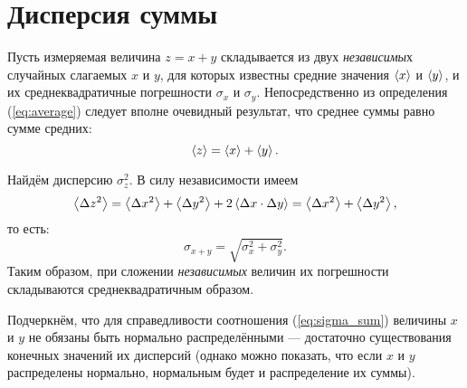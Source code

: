 %

\section{Дисперсия суммы}\label{sec:sum2}

Пусть измеряемая величина $z=x+y$ складывается из двух \emph{независимы}х
случайных слагаемых $x$ и $y$, для которых известны средние значения
$\left<x\right>$ и $\left<y\right>$, и их среднеквадратичные погрешности
$\sigma_{x}$ и $\sigma_{y}$. Непосредственно из определения (\ref{eq:average})
следует вполне очевидный результат, что среднее суммы равно сумме
средних:
\[
    \left<z\right>=\left<x\right>+\left<y\right>.
\]

Найдём дисперсию $\sigma_{z}^{2}$. В силу независимости имеем
\[
    \left<\Delta z^{2}\right>=\left<\Delta x^{2}\right>+\left<\Delta
    y^{2}\right>+2\left<\Delta x\cdot\Delta y\right>=\left<\Delta x^{2}\right>+\left<\Delta
    y^{2}\right>,
\]
то есть:
\begin{equation}
    \label{eq:sigma_sum}
    \boxed{{\sigma_{x+y}=\sqrt{\sigma_{x}^{2}+\sigma_{y}^{2}}}}.
\end{equation}
Таким образом, при сложении \emph{независимых }величин их погрешности
складываются среднеквадратичным образом.

Подчеркнём, что для справедливости соотношения (\ref{eq:sigma_sum})
величины $x$ и $y$ не обязаны быть нормально распределёнными ---
достаточно существования конечных значений их дисперсий (однако можно
показать, что если $x$ и $y$ распределены нормально, нормальным
будет и распределение их суммы).


